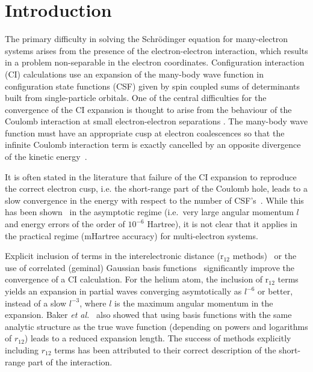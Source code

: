 \section{Introduction}
%
The primary difficulty in solving the Schr\"odinger equation for
many-electron systems arises from the presence of the electron-electron 
interaction, which results in a problem non-separable in the electron
coordinates.
Configuration interaction (CI) calculations use an expansion of the
many-body wave function in configuration state functions (CSF) 
given by spin coupled sums of determinants built from single-particle 
orbitals. 
One of the central difficulties for the convergence of the CI 
expansion is thought to arise from the behaviour of the Coulomb 
interaction at small electron-electron separations \cite{%
KlahnMorg,Hill,Morgan:CIconv,r12,KutzMorg,Hoff,Helgaker,%
Lein,NooBar,Silanes}.
The many-body wave function must have an appropriate cusp at 
electron coalescences so that the infinite Coulomb 
interaction term is exactly cancelled by an opposite divergence 
of the kinetic energy~\cite{Kato:cusp}.

It is often stated in the literature that failure of the CI expansion
to reproduce the correct electron cusp, i.e. the short-range part of 
the Coulomb hole, leads to a slow convergence in the energy with 
respect to the number of CSF's~\cite{Morgan:CIconv}.
While this has been shown~\cite{Hill,KutzMorg} in the asymptotic regime 
(i.e.\ very large angular momentum $l$ and energy errors of the order 
of $10^{-6}$ Hartree), it is not clear that it applies in the 
practical regime (mHartree accuracy) for multi-electron systems.

Explicit inclusion of terms in the interelectronic distance 
(r$_{12}$ methods)~\cite{Hyll,r12}
or the use of correlated (geminal) Gaussian basis functions~\cite{gem_gauss} 
significantly improve the convergence of a CI calculation.
For the helium atom, the inclusion of r$_{12}$ terms~\cite{KutzMorg} 
yields an expansion in partial waves converging asymtotically as 
$l^{-6}$ or better, instead of a slow $l^{-3}$,
where $l$ is the maximum angular momentum in the expansion.
Baker {\it et al.}~\cite{BFHM90} also showed that using basis 
functions with the same analytic structure as the true wave 
function (depending on powers and logarithms of $r_{12}$) 
leads to a reduced expansion length. 
The success of methods explicitly including $r_{12}$ terms has been 
attributed to their correct description of the short-range part 
of the interaction.

